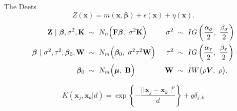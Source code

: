 \documentclass[ xcolor = pdftex, dvipsnames, table ]{beamer}
\begin{document}
\subsection{}
\begin{frame}{The Deets}
 \begin{equation*}
        Z(\bm{x}) = m(\bm{x}, \bm{\beta}) + \epsilon(\bm{x}) + \eta(\bm{x}).
        \label{baseEq}
\end{equation*}
\vspace{0.1cm}
\begin{equation*}
        \begin{aligned}
        \text{\textbf{Z}} ~|~ \bm{\beta}, \sigma^2, \text{\textbf{K}} &~\sim~ N_n\Big(\text{\textbf{F}}\bm{\beta},~ \sigma^2\text{\textbf{K}}\Big)
        &~ \sigma^2 &~\sim~ IG\left(\frac{\alpha_\sigma}{2}, ~\frac{\beta_\sigma}{2}\right)
        \\
        \bm{\beta} ~|~ \sigma^2, \tau^2, \bm{\beta}_0, \text{\textbf{W}} &~\sim~ N_m\Big(\bm{\beta}_0,~ \sigma^2\tau^2\text{\textbf{W}}\Big) &~
	\tau^2 &~\sim~ IG\left(\frac{\alpha_\tau}{2}, ~\frac{\beta_\tau}{2}\right)
        \\
	\bm{\beta}_0 &~\sim~ N_m\Big( \bm{\mu}, ~\text{\textbf{B}} \Big) &~
	\text{\textbf{W}} &~\sim~ IW\big(\rho\bm{V}, ~\rho\big).
        \label{gpModel}
        \end{aligned}
\end{equation*}

\begin{equation*}
        K(\bm{x}_j, \bm{x}_k|d) = \exp\left\{ -\frac{||\bm{x}_j-\bm{x}_k||^p}{d} \right\} + g \delta_{j,k}
\end{equation*}

\end{frame}
\end{document}
